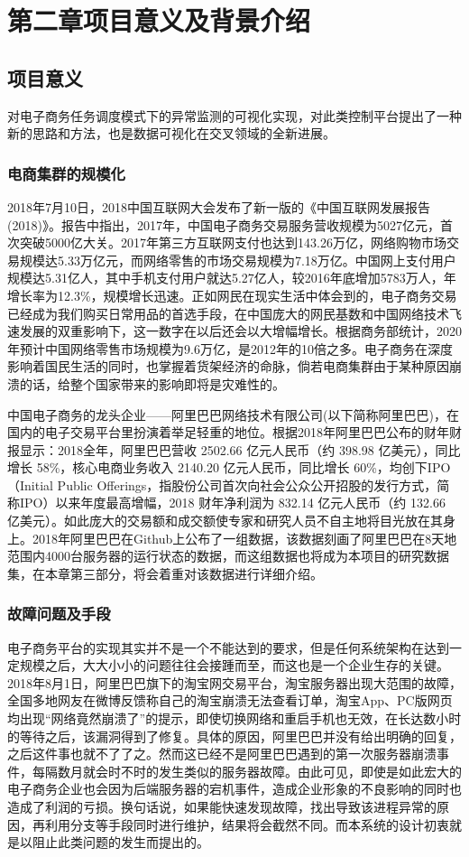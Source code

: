 \section{第二章\quad 项目意义及背景介绍}
\subsection{项目意义}
对电子商务任务调度模式下的异常监测的可视化实现，对此类控制平台提出了一种新的思路和方法，也是数据可视化在交叉领域的全新进展。
\subsubsection{电商集群的规模化}
2018年7月10日，2018中国互联网大会发布了新一版的《中国互联网发展报告(2018)》。报告中指出，2017年，中国电子商务交易服务营收规模为5027亿元，首次突破5000亿大关。2017年第三方互联网支付也达到143.26万亿，网络购物市场交易规模达5.33万亿元，而网络零售的市场交易规模为7.18万亿。中国网上支付用户规模达5.31亿人，其中手机支付用户就达5.27亿人，较2016年底增加5783万人，年增长率为12.3\%，规模增长迅速。正如网民在现实生活中体会到的，电子商务交易已经成为我们购买日常用品的首选手段，在中国庞大的网民基数和中国网络技术飞速发展的双重影响下，这一数字在以后还会以大增幅增长。根据商务部统计，2020年预计中国网络零售市场规模为9.6万亿，是2012年的10倍之多。电子商务在深度影响着国民生活的同时，也掌握着货架经济的命脉，倘若电商集群由于某种原因崩溃的话，给整个国家带来的影响即将是灾难性的。

中国电子商务的龙头企业——阿里巴巴网络技术有限公司(以下简称阿里巴巴)，在国内的电子交易平台里扮演着举足轻重的地位。根据2018年阿里巴巴公布的财年财报显示：2018全年，阿里巴巴营收 2502.66 亿元人民币（约 398.98 亿美元），同比增长 58\%，核心电商业务收入 2140.20 亿元人民币，同比增长 60\%，均创下IPO（Initial Public Offerings，指股份公司首次向社会公众公开招股的发行方式，简称IPO）以来年度最高增幅，2018 财年净利润为 832.14 亿元人民币（约 132.66 亿美元）。如此庞大的交易额和成交额使专家和研究人员不自主地将目光放在其身上。2018年阿里巴巴在Github上公布了一组数据，该数据刻画了阿里巴巴在8天地范围内4000台服务器的运行状态的数据，而这组数据也将成为本项目的研究数据集，在本章第三部分，将会着重对该数据进行详细介绍。

\subsubsection{故障问题及手段}
电子商务平台的实现其实并不是一个不能达到的要求，但是任何系统架构在达到一定规模之后，大大小小的问题往往会接踵而至，而这也是一个企业生存的关键。2018年8月1日，阿里巴巴旗下的淘宝网交易平台，淘宝服务器出现大范围的故障，全国多地网友在微博反馈称自己的淘宝崩溃无法查看订单，淘宝App、PC版网页均出现“网络竟然崩溃了”的提示，即使切换网络和重启手机也无效，在长达数小时的等待之后，该漏洞得到了修复。具体的原因，阿里巴巴并没有给出明确的回复，之后这件事也就不了了之。然而这已经不是阿里巴巴遇到的第一次服务器崩溃事件，每隔数月就会时不时的发生类似的服务器故障。由此可见，即使是如此宏大的电子商务企业也会因为后端服务器的宕机事件，造成企业形象的不良影响的同时也造成了利润的亏损。换句话说，如果能快速发现故障，找出导致该进程异常的原因，再利用分支等手段同时进行维护，结果将会截然不同。而本系统的设计初衷就是以阻止此类问题的发生而提出的。
